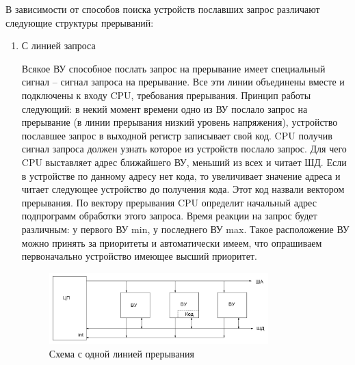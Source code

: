 \documentclass[unicode, 12pt, a4paper, oneside]{article}
\begin{document}
В зависимости от способов поиска устройств пославших запрос различают следующие структуры прерываний:
\begin{enumerate}
\item С линией запроса

Всякое ВУ способное послать запрос на прерывание имеет специальный сигнал – сигнал запроса на прерывание. Все эти линии объединены вместе и подключены к входу CPU, требования прерывания. Принцип работы следующий: в некий момент времени одно из ВУ послало запрос на прерывание (в линии прерывания низкий уровень напряжения), устройство пославшее запрос в выходной регистр записывает свой код. CPU получив сигнал запроса должен узнать которое из устройств послало запрос. Для чего CPU выставляет адрес ближайшего ВУ, меньший из всех и читает ШД. Если в устройстве по данному адресу нет кода, то увеличивает значение адреса и читает следующее устройство до получения кода. Этот код назвали вектором прерывания. По вектору прерывания CPU определит начальный адрес подпрограмм обработки этого  запроса. Время реакции на запрос будет различным: у первого ВУ min, у последнего ВУ max. Такое расположение ВУ можно принять за приоритеты и автоматически имеем, что опрашиваем первоначально устройство имеющее высший приоритет.
\begin{figure}[H]
\centering
\includegraphics[width=0.8\textwidth]{112_linia_prer.JPG}
\caption{Схема с одной линией прерывания}
\end{figure}


\end{enumerate}
\end{document}
